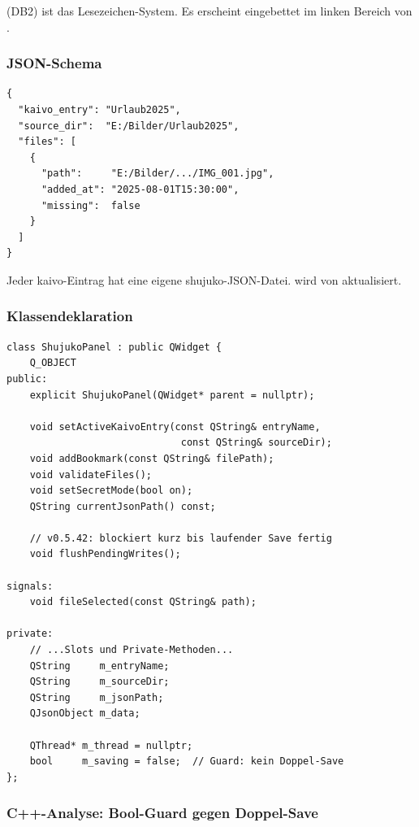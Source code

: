  (DB2) ist das Lesezeichen-System.
Es erscheint eingebettet im linken Bereich von
.

\subsubsection{JSON-Schema}

\begin{lstlisting}[language={},numbers=none,
  caption={<entryname>\_shujuko.json}]
{
  "kaivo_entry": "Urlaub2025",
  "source_dir":  "E:/Bilder/Urlaub2025",
  "files": [
    {
      "path":     "E:/Bilder/.../IMG_001.jpg",
      "added_at": "2025-08-01T15:30:00",
      "missing":  false
    }
  ]
}
\end{lstlisting}

Jeder kaivo-Eintrag hat eine eigene shujuko-JSON-Datei.
 wird von 
aktualisiert.

\subsubsection{Klassendeklaration}

\begin{lstlisting}[style=header, caption={shujukopanel.h -- Kern}]
class ShujukoPanel : public QWidget {
    Q_OBJECT
public:
    explicit ShujukoPanel(QWidget* parent = nullptr);

    void setActiveKaivoEntry(const QString& entryName,
                              const QString& sourceDir);
    void addBookmark(const QString& filePath);
    void validateFiles();
    void setSecretMode(bool on);
    QString currentJsonPath() const;

    // v0.5.42: blockiert kurz bis laufender Save fertig
    void flushPendingWrites();

signals:
    void fileSelected(const QString& path);

private:
    // ...Slots und Private-Methoden...
    QString     m_entryName;
    QString     m_sourceDir;
    QString     m_jsonPath;
    QJsonObject m_data;

    QThread* m_thread = nullptr;
    bool     m_saving = false;  // Guard: kein Doppel-Save
};
\end{lstlisting}

\subsubsection{C++-Analyse: Bool-Guard gegen Doppel-Save}

